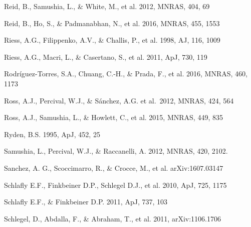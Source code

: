 \documentclass[iop]{emulateapj}
\begin{document}
\begin{thebibliography}{}
Reid, B., Samushia, L., \& White, M., et al. 2012, MNRAS, 404, 69



Reid, B., Ho, S., \& Padmanabhan, N., et al.  2016, MNRAS, 455, 1553

Riess, A.G., Filippenko, A.V., \& Challis, P., et al. 1998, AJ, 116, 1009  

Riess, A.G., Macri, L., \& Casertano, S., et al. 2011, ApJ, 730, 119

Rodr\'{i}guez-Torres, S.A., Chuang, C.-H., \&  Prada, F., et al. 
2016, MNRAS, 460, 1173

Ross, A.J., Percival, W.J., \& S{\'a}nchez, A.G. et al.\ 2012, MNRAS, 424, 564 

Ross, A.J., Samushia, L., \& Howlett, C., et al. 2015, MNRAS, 449, 835

Ryden, B.S. 1995, ApJ, 452, 25  



Samushia, L., Percival, W.J., \& Raccanelli, A. 2012,
MNRAS, 420, 2102.

Sanchez, A. G., Scoccimarro, R., \& Crocce, M., et al.
arXiv:1607.03147

Schlafly E.F., Finkbeiner D.P., Schlegel D.J., et al. 2010, ApJ, 725, 1175

Schlafly E.F., \& Finkbeiner D.P. 2011, ApJ, 737, 103


Schlegel, D., Abdalla, F., \& Abraham, T., et al. 2011, arXiv:1106.1706


\end{thebibliography}
\end{document}
